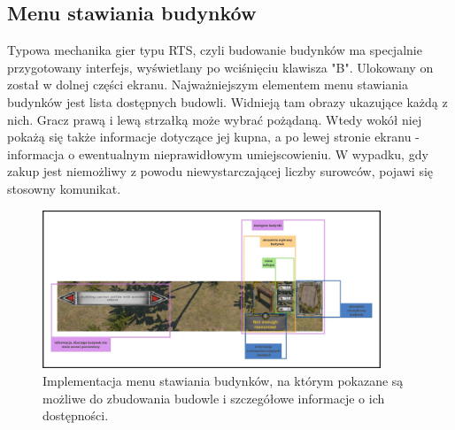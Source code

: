 \subsection{Menu stawiania budynków}
Typowa mechanika gier typu RTS, czyli budowanie budynków ma specjalnie przygotowany interfejs, wyświetlany po wciśnięciu klawisza "B". 
Ulokowany on został w dolnej części ekranu. Najważniejszym elementem menu stawiania budynków jest lista dostępnych budowli. Widnieją tam 
obrazy ukazujące każdą z nich. Gracz prawą i lewą strzałką może wybrać pożądaną. Wtedy wokół niej pokażą się także informacje dotyczące jej kupna,
a po lewej stronie ekranu - informacja o ewentualnym nieprawidłowym umiejscowieniu. W wypadku, gdy zakup jest niemożliwy z powodu niewystarczającej liczby 
surowców, pojawi się stosowny komunikat.
\begin{figure}[htbp]
    \centering
    \includegraphics[width=0.9\textwidth]{images/ui/opis_ekementow_budowanie.png}
    \caption{Implementacja menu stawiania budynków, na którym pokazane są możliwe do zbudowania budowle 
    i szczegółowe informacje o ich dostępności.
    }\label{fig:compass}
\end{figure}

